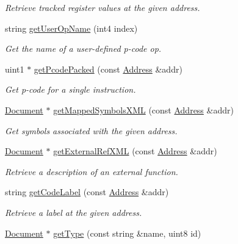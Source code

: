 \begin{DoxyCompactItemize}
\begin{DoxyCompactList}\small\item\em Retrieve {\itshape tracked} register values at the given address. \end{DoxyCompactList}\item 
string \mbox{\hyperlink{class_architecture_ghidra_a743c6158bb0075ab7c13d15725d13414}{get\+User\+Op\+Name}} (int4 index)
\begin{DoxyCompactList}\small\item\em Get the name of a user-\/defined p-\/code op. \end{DoxyCompactList}\item 
uint1 $\ast$ \mbox{\hyperlink{class_architecture_ghidra_a4ebbc30bfe4806007c73b4c5ea0645bf}{get\+Pcode\+Packed}} (const \mbox{\hyperlink{class_address}{Address}} \&addr)
\begin{DoxyCompactList}\small\item\em Get p-\/code for a single instruction. \end{DoxyCompactList}\item 
\mbox{\hyperlink{class_document}{Document}} $\ast$ \mbox{\hyperlink{class_architecture_ghidra_a03d6804fba40e0c09e6be5e3ad5f8723}{get\+Mapped\+Symbols\+X\+ML}} (const \mbox{\hyperlink{class_address}{Address}} \&addr)
\begin{DoxyCompactList}\small\item\em Get symbols associated with the given address. \end{DoxyCompactList}\item 
\mbox{\hyperlink{class_document}{Document}} $\ast$ \mbox{\hyperlink{class_architecture_ghidra_ab3f7d8642e6d84aa7ee3806620ef34ff}{get\+External\+Ref\+X\+ML}} (const \mbox{\hyperlink{class_address}{Address}} \&addr)
\begin{DoxyCompactList}\small\item\em Retrieve a description of an external function. \end{DoxyCompactList}\item 
string \mbox{\hyperlink{class_architecture_ghidra_ad66f093e36881a04b3dd40971373ce9e}{get\+Code\+Label}} (const \mbox{\hyperlink{class_address}{Address}} \&addr)
\begin{DoxyCompactList}\small\item\em Retrieve a label at the given address. \end{DoxyCompactList}\item 
\mbox{\hyperlink{class_document}{Document}} $\ast$ \mbox{\hyperlink{class_architecture_ghidra_ad3176a91f7b9643326d94eaab5613a1c}{get\+Type}} (const string \&name, uint8 id)

\end{DoxyCompactItemize}
